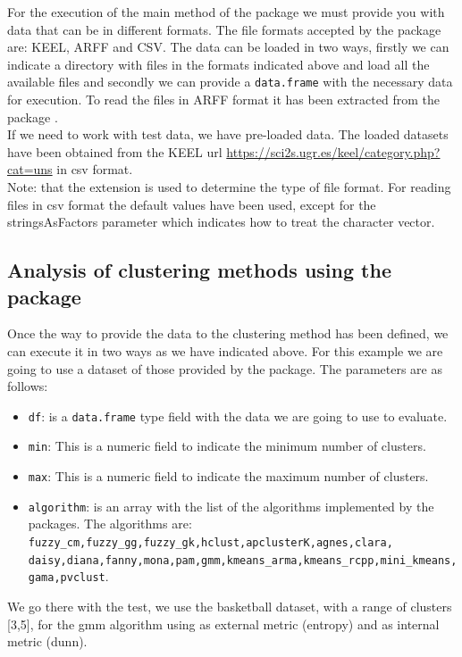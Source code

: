 For the execution of the main method of the package we must provide you with data that can be in different formats. The file formats accepted by the package are: KEEL, ARFF and CSV. The data can be loaded in two ways, firstly we can indicate a directory with files in the formats indicated above and load all the available files and secondly we can provide a \texttt{data.frame} with the necessary data for execution. To read the files in ARFF format it has been extracted from the  package \cite{b55}.\\
If we need to work with test data, we have pre-loaded data. The loaded datasets have been obtained from the KEEL url \url{https://sci2s.ugr.es/keel/category.php?cat=uns} in csv format.\\
Note: that the extension is used to determine the type of file format. For reading files in csv format the default values have been used, except for the stringsAsFactors parameter which indicates how to treat the character vector.

\subsection*{Analysis of clustering methods using the  package}

Once the way to provide the data to the clustering method has been defined, we can execute it in two ways as we have indicated above. For this example we are going to use a dataset of those provided by the package. The parameters are as follows:
\begin{itemize}
  \item \texttt{df}: is a \texttt{data.frame} type field with the data we are going to use to evaluate.
  \item \texttt{min}: This is a numeric field to indicate the minimum number of clusters.
  \item \texttt{max}: This is a numeric field to indicate the maximum number of clusters.
  \item \texttt{algorithm}: is an array with the list of the algorithms implemented by the packages. The algorithms are: \texttt{fuzzy\_cm,fuzzy\_gg,fuzzy\_gk,hclust,apclusterK,agnes,clara,\\daisy,diana,fanny,mona,pam,gmm,kmeans\_arma,kmeans\_rcpp,mini\_kmeans,gama,pvclust}.
\end{itemize}

We go there with the test, we use the basketball dataset, with a range of clusters [3,5], for the gmm algorithm using as external metric (entropy) and as internal metric (dunn).

